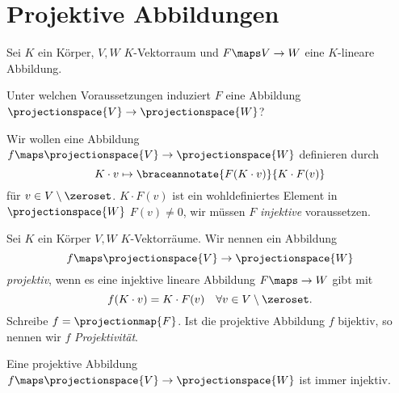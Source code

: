 \section{Projektive Abbildungen}
Sei \( K \) ein Körper, \( V,W \) \( K \)-Vektorraum und \( F\maps V\to W \) eine \( K \)-lineare Abbildung.
\begin{frage*}
  Unter welchen Voraussetzungen induziert \( F \) eine Abbildung \( \projectionspace{V}\to \projectionspace{W} \)?
\end{frage*}
Wir wollen eine Abbildung \( f\maps \projectionspace{V}\to \projectionspace{W}  \) definieren durch
\begin{equation*}
  K\cdot v\mapsto \braceannotate{F(K\cdot v)}{K\cdot F(v)}
\end{equation*}
für \( v\in V\setminus \zeroset \). \( K\cdot F(v) \) ist ein wohldefiniertes Element in \( \projectionspace{W} \) \gdw \( F(v)\neq0 \), \dh wir müssen \( F \) \emph{injektive} voraussetzen.
\begin{definition*}
  Sei \( K \) ein Körper \( V,W \) \( K \)-Vektorräume. Wir nennen ein Abbildung
  \begin{equation*}
    f\maps \projectionspace{V}\to \projectionspace{W}
  \end{equation*}
  \emph{projektiv}, wenn es eine injektive lineare Abbildung \( F\maps \to W \) gibt mit
  \begin{equation*}
    f(K\cdot v)=K\cdot F(v)\quad \forall v\in V\setminus\zeroset.
  \end{equation*}
  Schreibe \( f=\projectionmap{F} \). Ist die projektive Abbildung \( f \) bijektiv, so nennen wir \( f \) \emph{Projektivität}.
\end{definition*}
\begin{bemerkung*}
  Eine projektive Abbildung \( f\maps \projectionspace{V}\to \projectionspace{W}  \) ist immer injektiv.
\end{bemerkung*}
